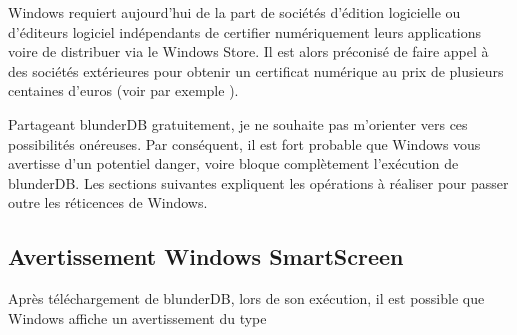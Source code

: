 \documentclass[letterpaper,10pt,french]{sphinxmanual}
\begin{document}
\sphinxAtStartPar
Windows requiert aujourd’hui de la part de sociétés d’édition logicielle ou
d’éditeurs logiciel indépendants de certifier numériquement leurs applications
voire de distribuer via le Windows Store. Il est alors préconisé de faire appel
à des sociétés extérieures pour obtenir un certificat numérique au prix de
plusieurs centaines d’euros (voir par exemple
).

\sphinxAtStartPar
Partageant blunderDB gratuitement, je ne souhaite pas m’orienter vers ces
possibilités onéreuses. Par conséquent, il est fort probable que Windows vous
avertisse d’un potentiel danger, voire bloque complètement l’exécution de
blunderDB. Les sections suivantes expliquent les opérations à réaliser pour
passer outre les réticences de Windows.


\subsection{Avertissement Windows SmartScreen}
\label{\detokenize{annexe_windows_securite:avertissement-windows-smartscreen}}
\sphinxAtStartPar
Après téléchargement de blunderDB, lors de son exécution, il est possible que
Windows affiche un avertissement du type

\begin{figure}[htbp]
\centering

\noindent{}
\end{figure}
\end{document}
